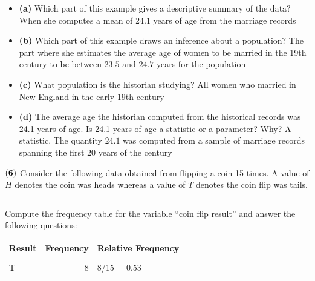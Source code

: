\documentclass[
]{article}
\providecommand{\tightlist}{%
  \setlength{\itemsep}{0pt}\setlength{\parskip}{0pt}}
\begin{document}
\begin{itemize}
\tightlist
\item
  \textbf{(a)} Which part of this example gives a descriptive summary of
  the data? {When she computes a mean of \(24.1\) years of age from the
  marriage records}
\item
  \textbf{(b)} Which part of this example draws an inference about a
  population? {The part where she estimates the average age of women to
  be married in the 19th century to be between \(23.5\) and \(24.7\)
  years for the population}
\item
  \textbf{(c)} What population is the historian studying? {All women who
  married in New England in the early 19th century}
\item
  \textbf{(d)} The average age the historian computed from the
  historical records was 24.1 years of age. Is 24.1 years of age a
  statistic or a parameter? Why? {A statistic. The quantity \(24.1\) was
  computed from a sample of marriage records spanning the first \(20\)
  years of the century}
\end{itemize}

\({\bf (6)}\) Consider the following data obtained from flipping a coin
15 times. A value of \(H\) denotes the coin was heads whereas a value of
\(T\) denotes the coin flip was tails.

\begin{table}[H]
\centering\centering
\begin{tabular}{llllllllllllllll}
\toprule
\cellcolor{gray!10}{coin.flip.result.} & \cellcolor{gray!10}{H} & \cellcolor{gray!10}{H} & \cellcolor{gray!10}{H} & \cellcolor{gray!10}{T} & \cellcolor{gray!10}{H} & \cellcolor{gray!10}{T} & \cellcolor{gray!10}{T} & \cellcolor{gray!10}{T} & \cellcolor{gray!10}{H} & \cellcolor{gray!10}{H} & \cellcolor{gray!10}{T} & \cellcolor{gray!10}{T} & \cellcolor{gray!10}{T} & \cellcolor{gray!10}{H} & \cellcolor{gray!10}{T}\\
\bottomrule
\end{tabular}
\end{table}

Compute the frequency table for the variable ``coin flip result'' and
answer the following questions:

\begin{table}[H]
\centering\centering
\begin{tabular}{lrl}
\toprule
Result & Frequency & Relative Frequency\\
\midrule
\cellcolor{gray!10}{H} & \cellcolor{gray!10}{7} & \cellcolor{gray!10}{7/15 = 0.47}\\
T & 8 & 8/15 = 0.53\\
\bottomrule
\end{tabular}
\end{table}
\end{document}

